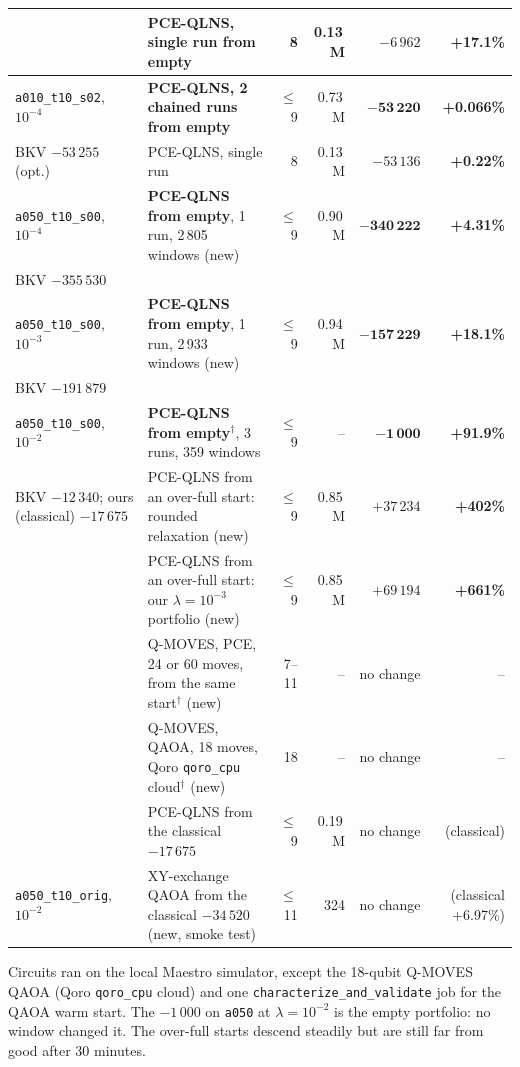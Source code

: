 \documentclass[11pt]{article}
\newcommand{\gapgood}[1]{\textcolor{good}{\textbf{#1}}}
\newcommand{\gapmid}[1]{\textcolor{mid}{\textbf{#1}}}
\newcommand{\gapbad}[1]{\textcolor{bad}{\textbf{#1}}}
\begin{document}
\begin{center}
\begin{tabularx}{\textwidth}{@{}>{\raggedright\arraybackslash}p{30mm}Lrrrr@{}}
 & PCE-QLNS, single run from empty & 8 & 0.13\,M & $-6\,962$ & \gapbad{+17.1\%}\\
\midrule
\texttt{a010\_t10\_s02}, $10^{-4}$ & \textbf{PCE-QLNS, 2 chained runs from empty} & $\le$9 & 0.73\,M & $\mathbf{-53\,220}$ & \gapmid{+0.066\%}\\
\footnotesize BKV $-53\,255$ (opt.) & PCE-QLNS, single run & 8 & 0.13\,M & $-53\,136$ & \gapmid{+0.22\%}\\
\midrule
{}
\texttt{a050\_t10\_s00}, $10^{-4}$ & \textbf{PCE-QLNS from empty}, 1 run, 2\,805 windows (new) & $\le$9 & 0.90\,M & $\mathbf{-340\,222}$ & \gapgood{+4.31\%}\\
\footnotesize BKV $-355\,530$ & & & & & \\
\midrule
\texttt{a050\_t10\_s00}, $10^{-3}$ & \textbf{PCE-QLNS from empty}, 1 run, 2\,933 windows (new) & $\le$9 & 0.94\,M & $\mathbf{-157\,229}$ & \gapmid{+18.1\%}\\
\footnotesize BKV $-191\,879$ & & & & & \\
\midrule
\texttt{a050\_t10\_s00}, $10^{-2}$ & \textbf{PCE-QLNS from empty}$^\dagger$, 3 runs, 359 windows & $\le$9 & -- & $\mathbf{-1\,000}$ & \gapbad{+91.9\%}\\
\footnotesize BKV $-12\,340$; ours (classical) $-17\,675$ & PCE-QLNS from an over-full start: rounded relaxation (new) & $\le$9 & 0.85\,M & $+37\,234$ & \gapbad{+402\%}\\
 & PCE-QLNS from an over-full start: our $\lambda=10^{-3}$ portfolio (new) & $\le$9 & 0.85\,M & $+69\,194$ & \gapbad{+661\%}\\
 & Q-MOVES, PCE, 24 or 60 moves, from the same start$^\dagger$ (new) & 7--11 & -- & no change & --\\
 & Q-MOVES, QAOA, 18 moves, Qoro \texttt{qoro\_cpu} cloud$^\dagger$ (new) & 18 & -- & no change & --\\
 & PCE-QLNS from the classical $-17\,675$ & $\le$9 & 0.19\,M & no change & (classical)\\
\midrule
\texttt{a050\_t10\_orig}, $10^{-2}$ & XY-exchange QAOA from the classical $-34\,520$ (new, smoke test) & $\le$11 & 324 & no change & \footnotesize (classical +6.97\%)\\
\bottomrule
\end{tabularx}
\end{center}
\noindent Circuits ran on the local Maestro simulator, except the 18-qubit Q-MOVES QAOA (Qoro
\texttt{qoro\_cpu} cloud) and one \texttt{characterize\_and\_validate} job for the QAOA warm start.
The $-1\,000$ on \texttt{a050} at $\lambda=10^{-2}$ is the empty portfolio: no window changed it. The
over-full starts descend steadily but are still far from good after 30 minutes.
\end{document}

